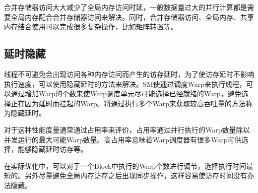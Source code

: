 合并存储器访问大大减少了全局内存访问时延，一般数据量过大的并行计算都是需要全局内存配合合并存储器访问来解决。同时，合并存储器访问、全局内存、共享内存结合使用可以完成很多复杂操作，比如矩阵转置等。


\subsection{延时隐藏}

线程不可避免会出现访问各种内存访问而产生的访存延时，为了使访存延时不影响执行速度，可以使用隐藏延时的方法来解决。SM使通过调度Warp来执行线程，可以通过增加Warp的个数来使Warp调度单元尽可能选择已经就绪的Warp，避免选择正在因为延时而挂起的Warp。将通过执行多个Warp来获取较高吞吐量的方法称为隐藏延时。

对于这种性能度量通常通过占用率来评价，占用率通过并行执行的Warp数量除以并发运行的最大可能Warp数量。高占用率意味着Warp调度器有很多Warp可供选择，能够隐藏延时访存等。

在实际优化中，可以对于一个Block中执行的Warp个数进行调节，选择执行时间最短的。另外尽量避免全局内存访存之后出现同步操作，这样容易使访存时间没有办法隐藏。

